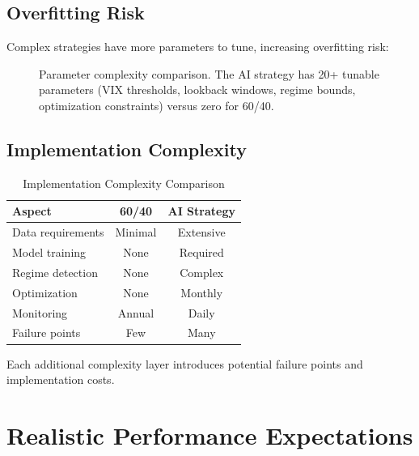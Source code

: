 \documentclass[twocolumn,ieee]{arithmaxresearch}
\begin{document}
\subsection{Overfitting Risk}

Complex strategies have more parameters to tune, increasing overfitting risk:

\begin{figure}[h]
\centering
{}
\caption{Parameter complexity comparison. The AI strategy has 20+ tunable parameters (VIX thresholds, lookback windows, regime bounds, optimization constraints) versus zero for 60/40.}
\label{fig:parameters}
\end{figure}

\subsection{Implementation Complexity}

\begin{table}[h]
\centering
\caption{Implementation Complexity Comparison}
\begin{tabular}{lcc}
\toprule
\textbf{Aspect} & \textbf{60/40} & \textbf{AI Strategy} \\
\midrule
Data requirements & Minimal & Extensive \\
Model training & None & Required \\
Regime detection & None & Complex \\
Optimization & None & Monthly \\
Monitoring & Annual & Daily \\
Failure points & Few & Many \\
\bottomrule
\end{tabular}
\end{table}

Each additional complexity layer introduces potential failure points and implementation costs.

\section{Realistic Performance Expectations}
\end{document}
